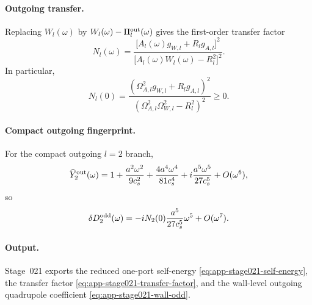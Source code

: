 \paragraph{Outgoing transfer.}
Replacing \(W_l(\omega)\) by \(W_l(\omega)-\Pi_l^{\rm out}(\omega)\) gives
the first-order transfer factor
\begin{equation}
\label{eq:app-stage021-transfer-factor}
N_l(\omega)=
\frac{\bigl[A_l(\omega)g_{W,l}+R_lg_{A,l}\bigr]^2}
{\bigl[A_l(\omega)W_l(\omega)-R_l^2\bigr]^2}.
\end{equation}
In particular,
\begin{equation}
\label{eq:app-stage021-n0-positive}
N_l(0)=
\frac{(\Omega_{A,l}^2g_{W,l}+R_lg_{A,l})^2}
{(\Omega_{A,l}^2\Omega_{W,l}^2-R_l^2)^2}\ge0.
\end{equation}

\paragraph{Compact outgoing fingerprint.}
For the compact outgoing \(l=2\) branch,
\begin{equation}
\label{eq:app-stage021-outgoing-fingerprint}
\widehat Y_2^{\rm out}(\omega)
=1+\frac{a^2\omega^2}{9c_s^2}
+\frac{4a^4\omega^4}{81c_s^4}
+i\frac{a^5\omega^5}{27c_s^5}
+O(\omega^6),
\end{equation}
so
\begin{equation}
\label{eq:app-stage021-wall-odd}
\delta D_2^{\rm odd}(\omega)
=-iN_2(0)\frac{a^5}{27c_s^5}\omega^5+O(\omega^7).
\end{equation}

\paragraph{Output.}
Stage~021 exports the reduced one-port self-energy
\eqref{eq:app-stage021-self-energy}, the transfer factor
\eqref{eq:app-stage021-transfer-factor}, and the wall-level outgoing
quadrupole coefficient \eqref{eq:app-stage021-wall-odd}.

